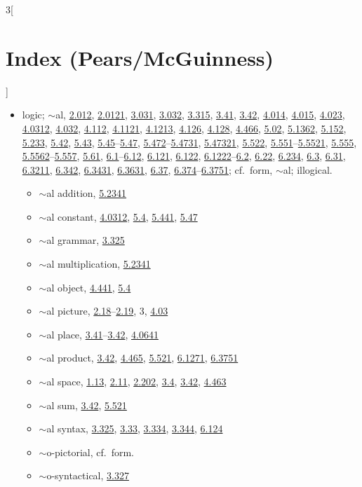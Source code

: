 \documentclass[oneside,openany,12pt]{book}
\newcommand{\indexentry}[1]{\item #1}
\newcommand{\indexsubentry}[1]{\begin{itemize} \item #1 \end{itemize}}
\newcommand{\indexref}[1]{\hyperlink{prop#1}{#1}}
\begin{document}
\begin{multicols}{3}[\section*{Index (Pears/McGuinness)}]
\begin{itemize}
\indexentry{logic; $\sim$al, \indexref{2.012}, \indexref{2.0121}, \indexref{3.031}, \indexref{3.032}, \indexref{3.315}, \indexref{3.41}, \indexref{3.42}, \indexref{4.014}, \indexref{4.015}, \indexref{4.023}, \indexref{4.0312}, \indexref{4.032}, \indexref{4.112}, \indexref{4.1121}, \indexref{4.1213}, \indexref{4.126}, \indexref{4.128}, \indexref{4.466}, \indexref{5.02}, \indexref{5.1362}, \indexref{5.152}, \indexref{5.233}, \indexref{5.42}, \indexref{5.43}, \indexref{5.45}--\indexref{5.47}, \indexref{5.472}--\indexref{5.4731}, \indexref{5.47321}, \indexref{5.522}, \indexref{5.551}--\indexref{5.5521}, \indexref{5.555}, \indexref{5.5562}--\indexref{5.557}, \indexref{5.61}, \indexref{6.1}--\indexref{6.12}, \indexref{6.121}, \indexref{6.122}, \indexref{6.1222}--\indexref{6.2}, \indexref{6.22}, \indexref{6.234}, \indexref{6.3}, \indexref{6.31}, \indexref{6.3211}, \indexref{6.342}, \indexref{6.3431}, \indexref{6.3631}, \indexref{6.37}, \indexref{6.374}--\indexref{6.3751}; cf.\ form, $\sim$al; illogical.}

   \indexsubentry{$\sim$al addition, \indexref{5.2341}}

   \indexsubentry{$\sim$al constant, \indexref{4.0312}, \indexref{5.4}, \indexref{5.441}, \indexref{5.47}}

   \indexsubentry{$\sim$al grammar, \indexref{3.325}}

   \indexsubentry{$\sim$al multiplication, \indexref{5.2341}}

   \indexsubentry{$\sim$al object, \indexref{4.441}, \indexref{5.4}}

   \indexsubentry{$\sim$al picture, \indexref{2.18}--\indexref{2.19}, 3, \indexref{4.03}}

   \indexsubentry{$\sim$al place, \indexref{3.41}--\indexref{3.42}, \indexref{4.0641}}

   \indexsubentry{$\sim$al product, \indexref{3.42}, \indexref{4.465}, \indexref{5.521}, \indexref{6.1271}, \indexref{6.3751}}

   \indexsubentry{$\sim$al space, \indexref{1.13}, \indexref{2.11}, \indexref{2.202}, \indexref{3.4}, \indexref{3.42}, \indexref{4.463}}

   \indexsubentry{$\sim$al sum, \indexref{3.42}, \indexref{5.521}}

   \indexsubentry{$\sim$al syntax, \indexref{3.325}, \indexref{3.33}, \indexref{3.334}, \indexref{3.344}, \indexref{6.124}}

   \indexsubentry{$\sim$o-pictorial, cf.\ form.}

   \indexsubentry{$\sim$o-syntactical, \indexref{3.327}}


\end{itemize}
\end{multicols}
\end{document}
